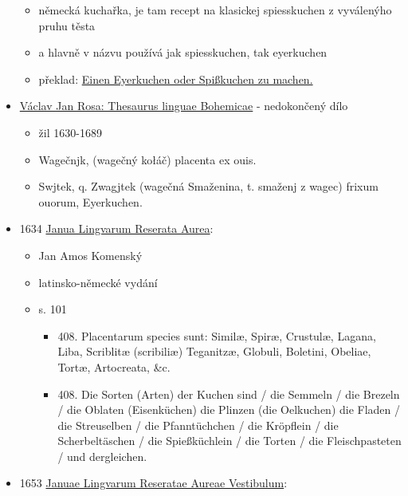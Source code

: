 \begin{itemize}
  \begin{itemize}
  \tightlist
  \item
    německá kuchařka, je tam recept na klasickej spiesskuchen z
    vyválenýho pruhu těsta
  \item
    a hlavně v názvu používá jak spiesskuchen, tak eyerkuchen
  \item
    překlad: \hyperref[250605-2334]{Einen Eyerkuchen oder Spißkuchen zu
    machen.}
  \end{itemize}
\item
  \href{https://bara.ujc.cas.cz/slovniky/rosa/rosafst1480.html}{Václav
  Jan Rosa: Thesaurus linguae Bohemicae} - nedokončený dílo

  \begin{itemize}
  \tightlist
  \item
    žil 1630-1689
  \item
    Wagečnjk, (wagečný kołáč) placenta ex ouis.
  \item
    Swjtek, q. Zwagjtek (wagečná Smaženina, t. smaženj z wagec) frixum
    ouorum, Eyerkuchen.
  \end{itemize}
\item
  1634
  \href{https://ceskadigitalniknihovna.cz/uuid/uuid:e8cd9396-bbda-47f7-aac7-3f4a843367f6}{Janua
  Lingvarum Reserata Aurea}:

  \begin{itemize}
  \tightlist
  \item
    Jan Amos Komenský
  \item
    latinsko-německé vydání
  \item
    s. 101

    \begin{itemize}
    \tightlist
    \item
      408. Placentarum species sunt: Similæ, Spiræ, Crustulæ, Lagana,
      Liba, Scriblitæ (scribiliæ) Teganitzæ, Globuli, Boletini, Obeliae,
      Tortæ, Artocreata, \&c.
    \item
      408. Die Sorten (Arten) der Kuchen sind / die Semmeln / die
      Brezeln / die Oblaten (Eisenküchen) die Plinzen (die Oelkuchen)
      die Fladen / die Streuselben / die Pfanntüchchen / die Kröpflein /
      die Scherbeltäschen / die Spießküchlein / die Torten / die
      Fleischpasteten / und dergleichen.
    \end{itemize}
  \end{itemize}
\item
  1653
  \href{https://ceskadigitalniknihovna.cz/uuid/uuid:849c5567-5ea1-4490-835d-eca31d9b479c}{Januae
  Lingvarum Reseratae Aureae Vestibulum}:


\end{itemize}
